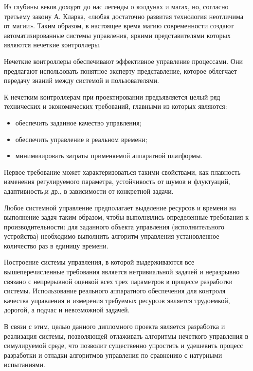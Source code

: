 %


Из глубины веков доходят до нас легенды о колдунах и магах, но, согласно третьему закону А. Кларка, «любая достаточно развитая технология неотличима от магии». Таким образом, в настоящее время магию современности создают автоматизированные системы управления, яркими представителями которых являются нечеткие контроллеры.

Нечеткие контроллеры обеспечивают эффективное управление процессами. Они предлагают использовать понятное эксперту представление, которое облегчает передачу знаний между системой и пользователями.

К нечетким контроллерам при проектировании предъявляется целый ряд технических и экономических требований, главными из которых являются:

\begin{itemize}
  \item обеспечить заданное качество управления;
  \item обеспечить управление в реальном времени; 
  \item минимизировать затраты применяемой аппаратной платформы.
\end{itemize}

Первое требование может характеризоваться такими свойствами, как плавность изменения регулируемого параметра, устойчивость от шумов и флуктуаций, адаптивность,и др., в зависимости от конкретной задачи.

Любое системной управление предполагает выделение ресурсов и времени на выполнение задач таким образом, чтобы выполнялись определенные требования к производительности: для заданного объекта управления (исполнительного устройства) необходимо выполнить алгоритм управления установленное количество раз в единицу времени. 

Построение системы управления, в которой выдерживаются все вышеперечисленные требования является нетривиальной задачей и неразрывно связано с непрерывной оценкой всех трех параметров в процессе разработки системы. Использование реального аппаратного обеспечения для контроля качества управления и измерения требуемых ресурсов является трудоемкой, дорогой, а подчас и невозможной задачей.

В связи с этим, целью данного дипломного проекта является разработка и реализация системы, позволяющей отлаживать алгоритмы нечеткого управления в симулируемой среде, что позволит существенно упростить и удешевить процесс разработки и отладки алгоритмов управления по сравнению с натурными испытаниями.	

